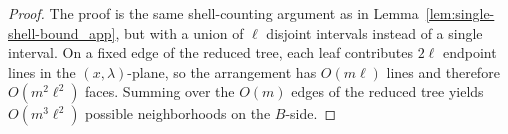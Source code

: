 \documentclass[a4paper,UKenglish,cleveref,autoref,thm-restate]{socg-lipics-v2021}
\begin{document}
\begin{proof}
The proof is the same shell-counting argument as in
Lemma~\ref{lem:single-shell-bound_app}, but with a union of \(\ell\) disjoint intervals
instead of a single interval. On a fixed edge of the reduced tree, each leaf contributes
\(2\ell\) endpoint lines in the \((x,\lambda)\)-plane, so the arrangement has
\(O(m\ell)\) lines and therefore \(O(m^2\ell^2)\) faces. Summing over the \(O(m)\)
edges of the reduced tree yields \(O(m^3\ell^2)\) possible neighborhoods on the
\(B\)-side.
\end{proof}
\end{document}
